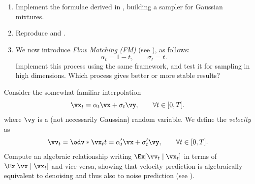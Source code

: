 \documentclass[../../book-main.tex]{subfiles}
\begin{document}
\begin{exercise}\label{exercise:implement_denoising_processes}
    \phantom{}
    \begin{enumerate}
        \item Implement the formulae derived in
            ,
            building a sampler for Gaussian mixtures.
        \item Reproduce  and
            .
        \item We now introduce \textit{Flow
            Matching (FM)} (see ), as follows:
            \begin{equation}
                \alpha_{t} = 1 - t, \qquad \sigma_{t} = t.
            \end{equation}
            Implement this process using the same framework, and test it
            for sampling in high dimensions. Which process gives better
            or more stable results?
    \end{enumerate}
\end{exercise}

\begin{exercise}\label{exercise:velocity_prediction}
    Consider the somewhat familiar interpolation
    \begin{equation}
        \vx_{t} = \alpha_{t}\vx + \sigma_{t}\vy, \qquad \forall t
        \in [0, T].
    \end{equation}
    where \(\vy\) is a (not necessarily Gaussian) random
    variable. We define the \textit{velocity} as
    \begin{equation}
        \vv_{t} = \odv*{\vx_{t}}{t} = \alpha_{t}^{\prime}\vx +
        \sigma_{t}^{\prime}\vy, \qquad \forall t \in [0, T].
    \end{equation}
    Compute an algebraic relationship writing \(\Ex[\vv_{t} \mid
    \vx_{t}]\) in terms of \(\Ex[\vx \mid \vx_{t}]\) and vice
    versa, showing that velocity prediction is algebraically
    equivalent to denoising and thus also to noise prediction
    (see ).
\end{exercise}
\end{document}
